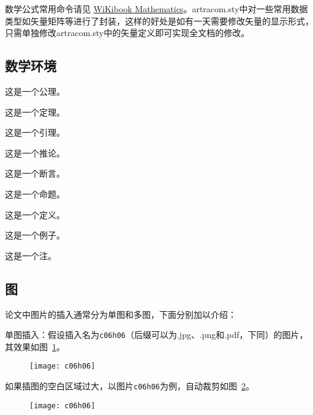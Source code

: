 {数学公式常用命令请见 \href{https://en.wikibooks.org/wiki/LaTeX/Mathematics}{WiKibook Mathematics}。artracom.sty中对一些常用数据类型如矢量矩阵等进行了封装，这样的好处是如有一天需要修改矢量的显示形式，只需单独修改artracom.sty中的矢量定义即可实现全文档的修改。

\subsection{数学环境}

\begin{axiom}
   这是一个公理。 
\end{axiom}
\begin{theorem}
   这是一个定理。 
\end{theorem}
\begin{lemma}
   这是一个引理。 
\end{lemma}
\begin{corollary}
   这是一个推论。 
\end{corollary}
\begin{assertion}
   这是一个断言。 
\end{assertion}
\begin{proposition}
   这是一个命题。 
\end{proposition}
\begin{definition}
    这是一个定义。
\end{definition}
\begin{example}
    这是一个例子。
\end{example}
\begin{remark}
    这是一个注。
\end{remark}

\subsection{图}

论文中图片的插入通常分为单图和多图，下面分别加以介绍：

单图插入：假设插入名为\verb|c06h06|（后缀可以为.jpg、.png和.pdf，下同）的图片，其效果如图~\ref{fig:c06h06}。
\begin{figure}[!htbp]
    \centering
    \texttt{[image: c06h06]}
    \label{fig:c06h06}
\end{figure}

如果插图的空白区域过大，以图片\verb|c06h06|为例，自动裁剪如图~\ref{fig:c06h06_trim}。
\begin{figure}[!htbp]
    \centering
    \texttt{[image: c06h06]}
    \label{fig:c06h06_trim}
\end{figure}

}
